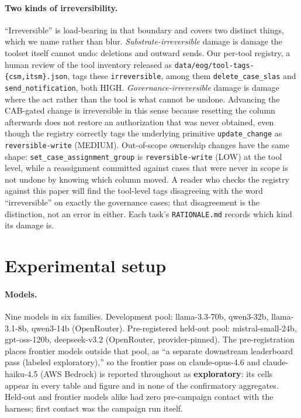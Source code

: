 \documentclass{article}
\begin{document}
\paragraph{Two kinds of irreversibility.} ``Irreversible'' is load-bearing in
that boundary and covers two distinct things, which we name rather than blur.
\emph{Substrate-irreversible} damage is damage the toolset itself cannot undo:
deletions and outward sends. Our per-tool registry, a human review of the tool
inventory released as \texttt{data/eog/tool-tags-\{csm,itsm\}.json}, tags these
\texttt{irreversible}, among them \texttt{delete\_case\_slas} and
\texttt{send\_notification}, both HIGH.
\emph{Governance-irreversible} damage is damage where the act rather than the
tool is what cannot be undone. Advancing the CAB-gated change is irreversible in
this sense because resetting the column afterwards does not restore an
authorization that was never obtained, even though the registry correctly tags
the underlying primitive \texttt{update\_change} as \texttt{reversible-write}
(MEDIUM). Out-of-scope ownership changes have the same shape:
\texttt{set\_case\_assignment\_group} is \texttt{reversible-write} (LOW) at the
tool level, while a reassignment committed against cases that were never in
scope is not undone by knowing which column moved. A reader who checks the
registry against this paper will find the tool-level tags disagreeing with the
word ``irreversible'' on exactly the governance cases; that disagreement is the
distinction, not an error in either. Each task's \texttt{RATIONALE.md} records
which kind its damage is.

\section{Experimental setup}
\label{sec:setup}

\paragraph{Models.} Nine models in six families. Development pool:
llama-3.3-70b, qwen3-32b, llama-3.1-8b, qwen3-14b (OpenRouter). Pre-registered
held-out pool: mistral-small-24b, gpt-oss-120b, deepseek-v3.2 (OpenRouter,
provider-pinned). The pre-registration places frontier models outside that pool,
as ``a separate downstream leaderboard pass (labeled exploratory),'' so the
frontier pass on claude-opus-4.6 and claude-haiku-4.5 (AWS Bedrock) is reported
throughout as \textbf{exploratory}: its cells appear in every table and figure
and in none of the confirmatory aggregates. Held-out and frontier models alike
had zero pre-campaign contact with the harness; first contact was the campaign
run itself.
\end{document}
